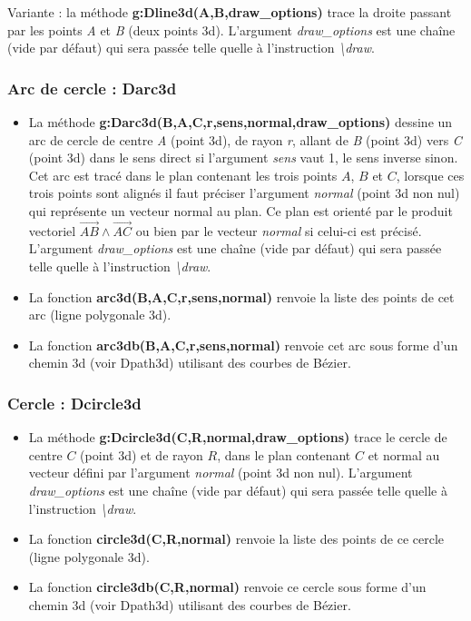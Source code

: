 Variante : la méthode \textbf{g:Dline3d(A,B,draw\_options)} trace la droite passant par les points \emph{A} et \emph{B} (deux points 3d). L'argument \emph{draw\_options} est une chaîne (vide par défaut) qui sera passée telle quelle à l'instruction \emph{\textbackslash draw}.

 \subsubsection{Arc de cercle : Darc3d}
 
\begin{itemize}
    \item La méthode \textbf{g:Darc3d(B,A,C,r,sens,normal,draw\_options)} dessine un arc de cercle de centre \emph{A} (point 3d), de rayon \emph{r}, allant de \emph{B} (point 3d) vers \emph{C} (point 3d) dans le sens direct si l'argument \emph{sens} vaut 1, le sens inverse sinon. Cet arc est tracé dans le plan contenant les trois points $A$, $B$ et $C$, lorsque ces trois points sont alignés il faut préciser l'argument \emph{normal} (point 3d non nul) qui représente un vecteur normal au plan. Ce plan est orienté par le produit vectoriel $\vec{AB}\wedge\vec{AC}$ ou bien par le vecteur \emph{normal} si celui-ci est précisé. L'argument \emph{draw\_options} est une chaîne (vide par défaut) qui sera passée telle quelle à l'instruction \emph{\textbackslash draw}.
    
    \item La fonction \textbf{arc3d(B,A,C,r,sens,normal)} renvoie la liste des points de cet arc (ligne polygonale 3d). 
    
    \item La fonction \textbf{arc3db(B,A,C,r,sens,normal)} renvoie cet arc sous forme d'un chemin 3d (voir Dpath3d) utilisant des courbes de Bézier.
\end{itemize}

\subsubsection{Cercle : Dcircle3d}

\begin{itemize}
    \item La méthode \textbf{g:Dcircle3d(C,R,normal,draw\_options)} trace le cercle de centre $C$ (point 3d) et de rayon $R$, dans le plan contenant $C$ et normal au vecteur défini par l'argument \emph{normal} (point 3d non nul). L'argument \emph{draw\_options} est une chaîne (vide par défaut) qui sera passée telle quelle à l'instruction \emph{\textbackslash draw}.
    
    \item La fonction \textbf{circle3d(C,R,normal)} renvoie la liste des points de ce cercle (ligne polygonale 3d). 
    
    \item La fonction \textbf{circle3db(C,R,normal)} renvoie ce cercle sous forme d'un chemin 3d (voir Dpath3d) utilisant des courbes de Bézier.
\end{itemize}
    
